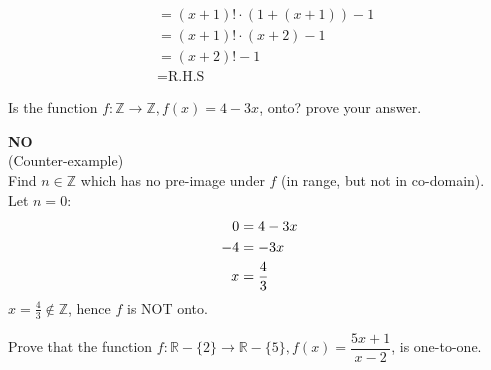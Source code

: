 \documentclass[answers]{exam}
\begin{document}
\begin{questions}
\begin{solutionorbox}[19cm]
\begin{align*}
                                                                 & = (x + 1)! \cdot (1 + (x+1)) - 1 \tag{Simplify}                                  \\
                                                                 & = (x + 1)! \cdot (x + 2) - 1 \tag{Simplify}                                      \\
                                                                 & = (x + 2)! - 1 \tag{Factorial Simplification}                                    \\
                                                                 & = \text{R.H.S} \tag{Proven}
            \end{align*}
        \end{solutionorbox}
    
    \question Is the function $f : \mathbb{Z} \longrightarrow \mathbb{Z}, f(x) = 4 - 3x$, onto? prove your answer.
    
        \begin{solutionorbox}
            \textbf{NO}\\
            (Counter-example)\\
            Find $n \in \mathbb{Z}$ which has no pre-image under $f$ (in range, but not in co-domain).\\
            Let $n = 0$:
            \begin{align}
                0    & = 4 - 3x \notag      \\
                -4   & = -3x \notag         \\
                x    & = \frac{4}{3} \notag
            \end{align}
            $x = \frac{4}{3} \notin \mathbb{Z}$, hence $f$ is NOT onto.
        \end{solutionorbox}
    
    \question Prove that the function $f : \mathbb{R} - \{ 2 \} \longrightarrow \mathbb{R} - \{ 5 \}, f(x) = \dfrac{5x + 1}{x - 2}$, is one-to-one.
    

\end{questions}
\end{document}
